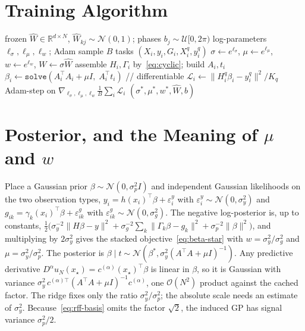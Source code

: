 \documentclass[fullpaper,final]{nldl}
\newcommand{\R}{\mathbb{R}}
\theoremstyle{plain}
\theoremstyle{definition}
\begin{document}
\printbibliography

\clearpage
\appendix

\section{Training Algorithm}
\label{app:alg}

\begin{algorithm}[tb]
\caption{Meta-LSQ training}
\label{alg:meta-lsq}
\begin{algorithmic}[1]
\Require frozen $\hat W \in \R^{d\times N}$, $\hat W_{kj}\sim\mathcal{N}(0,1)$;
         phases $b_j\sim\mathcal{U}[0,2\pi)$
\Require log-parameters $\ell_\sigma, \ell_\mu, \ell_w$; Adam
  \State sample $B$ tasks $(X_i,y_i,G_i,X_i^q,y_i^q)$
  \State $\sigma \gets e^{\ell_\sigma}$, $\mu \gets e^{\ell_\mu}$,
         $w \gets e^{\ell_w}$, $W \gets \sigma\hat W$
    \State assemble $H_i,\Gamma_i$ by~\eqref{eq:cyclic}; build $A_i,t_i$
    \State $\beta_i \gets \texttt{solve}(A_i^\top\! A_i + \mu I,\;A_i^\top t_i)$
           \hfill{\footnotesize// differentiable}
    \State $\mathcal{L}_i \gets \|H_i^q\beta_i - y_i^q\|^2/K_q$
  \EndFor
  \State Adam-step on $\nabla_{\ell_\sigma,\ell_\mu,\ell_w}
         \tfrac{1}{B}\sum_i \mathcal{L}_i$
\EndFor
\State \Return $(\sigma^\ast,\mu^\ast,w^\ast,\hat W,b)$
\end{algorithmic}
\end{algorithm}

\section{Posterior, and the Meaning of $\mu$ and $w$}
\label{app:posterior}

Place a Gaussian prior $\beta\sim\mathcal{N}(0,\sigma_p^2 I)$ and independent
Gaussian likelihoods on the two observation types, $y_i = h(x_i)^\top\beta +
\varepsilon^y_i$ with $\varepsilon^y_i \sim \mathcal{N}(0,\sigma_y^2)$ and $g_{ik}
= \gamma_k(x_i)^\top\beta + \varepsilon^g_{ik}$ with $\varepsilon^g_{ik} \sim
\mathcal{N}(0,\sigma_g^2)$. The negative log-posterior is, up to constants,
$\tfrac12\big(\sigma_y^{-2}\|H\beta-y\|^2 + \sigma_g^{-2}\sum_k\|\Gamma_k\beta-g_k\|^2
+ \sigma_p^{-2}\|\beta\|^2\big)$, and multiplying by $2\sigma_y^2$ gives the stacked
objective~\eqref{eq:beta-star} with $w = \sigma_y^2/\sigma_g^2$ and $\mu =
\sigma_y^2/\sigma_p^2$. The posterior is $\beta \mid t \sim \mathcal{N}(\beta^\ast,
\sigma_y^2 (A^\top\! A+\mu I)^{-1})$. Any predictive derivative $D^\alpha
u_N(x_\star) = c^{(\alpha)}(x_\star)^\top\beta$ is linear in $\beta$, so it is
Gaussian with variance $\sigma_y^2\,c^{(\alpha)\top}(A^\top\! A+\mu
I)^{-1}c^{(\alpha)}$, one $\mathcal{O}(N^2)$ product against the cached factor. The
ridge fixes only the ratio $\sigma_y^2/\sigma_p^2$; the absolute scale needs an
estimate of $\sigma_y^2$. Because~\eqref{eq:rff-basis} omits
the factor $\sqrt{2}$, the induced GP has signal variance $\sigma_p^2/2$.
\end{document}
